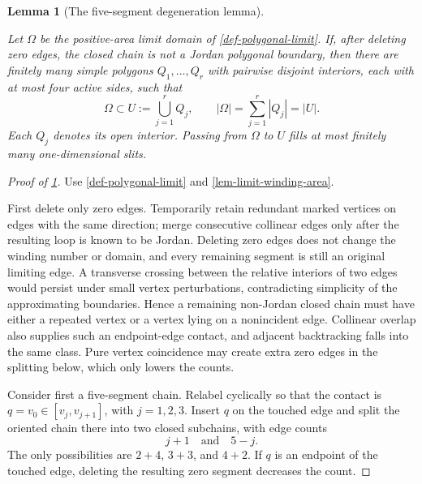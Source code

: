 \documentclass[11pt,a4paper]{article}
\theoremstyle{proofmanuscript}
\newtheorem{lemma}[theorem]{Lemma}
\begin{document}
\begin{lemma}[The five-segment degeneration lemma]\label{lem-five-segment-degeneration}

Let \(\Omega\) be the positive-area limit domain of \ref{def-polygonal-limit}. If, after deleting zero edges, the closed chain is not a Jordan polygonal boundary, then there are finitely many simple polygons \(Q_1,\ldots,Q_r\) with pairwise disjoint interiors, each with at most four active sides, such that \[
\Omega\subset U:=\bigcup_{j=1}^r Q_j,
\qquad |\Omega|=\sum_{j=1}^r|Q_j|=|U|.
\tag{A.3}
\] Each \(Q_j\) denotes its open interior. Passing from \(\Omega\) to \(U\) fills at most finitely many one-dimensional slits.

\end{lemma}

\begin{proof}[Proof of \ref{lem-five-segment-degeneration}]

Use \ref{def-polygonal-limit} and \ref{lem-limit-winding-area}.

First delete only zero edges. Temporarily retain redundant marked vertices on edges with the same direction; merge consecutive collinear edges only after the resulting loop is known to be Jordan. Deleting zero edges does not change the winding number or domain, and every remaining segment is still an original limiting edge. A transverse crossing between the relative interiors of two edges would persist under small vertex perturbations, contradicting simplicity of the approximating boundaries. Hence a remaining non-Jordan closed chain must have either a repeated vertex or a vertex lying on a nonincident edge. Collinear overlap also supplies such an endpoint-edge contact, and adjacent backtracking falls into the same class. Pure vertex coincidence may create extra zero edges in the splitting below, which only lowers the counts.

Consider first a five-segment chain. Relabel cyclically so that the contact is \(q=v_0\in[v_j,v_{j+1}]\), with \(j=1,2,3\). Insert \(q\) on the touched edge and split the oriented chain there into two closed subchains, with edge counts \[
j+1\quad\text{and}\quad5-j.
\] The only possibilities are \(2+4\), \(3+3\), and \(4+2\). If \(q\) is an endpoint of the touched edge, deleting the resulting zero segment decreases the count.


\end{proof}
\end{document}
